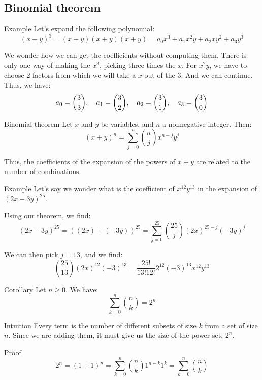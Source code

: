 \documentclass[a4paper]{article}
\begin{document}
\subsection{Binomial theorem}
\begin{parag}{Example}
    Let's expand the following polynomial: 
    \[\left(x + y\right)^3 = \left(x + y\right)\left(x + y\right)\left(x + y\right) = a_0 x^3 + a_1 x^2 y + a_2 xy^2 + a_3 y^3\]
    
    We wonder how we can get the coefficients without computing them. There is only one way of making the $x^3$, picking three times the $x$. For $x^2 y$, we have to choose 2 factors from which we will take a $x$ out of the 3. And we can continue. Thus, we have: 
    \[a_0 = \binom{3}{3}, \quad a_1 = \binom{3}{2}, \quad a_2 = \binom{3}{1}, \quad a_3 = \binom{3}{0}\]
\end{parag}

\begin{parag}{Binomial theorem}
    Let $x$ and $y$ be variables, and $n$ a nonnegative integer. Then: 
    \[\left(x + y\right)^n = \sum_{j=0}^{n} \binom{n}{j} x^{n - j} y^{j}\]
    
    Thus, the coefficients of the expansion of the powers of $x + y$ are related to the number of combinations.
\end{parag}


\begin{parag}{Example}
    Let's say we wonder what is the coefficient of $x^{12} y^{13}$ in the expansion of $\left(2x - 3y\right)^{25}$. 

    Using our theorem, we find: 
    \[\left(2x - 3y\right)^{25} = \left(\left(2x\right) + \left(-3y\right)\right)^{25} = \sum_{j=0}^{25} \binom{25}{j} \left(2x\right)^{25 - j} \left(-3y\right)^j\]
    
    We can then pick $j = 13$, and we find: 
    \[\binom{25}{13} \left(2x\right)^{12} \left(-3\right)^{13} = \frac{25!}{13!12!} 2^{12} \left(-3\right)^{13} x^{12} y^{13}\]
\end{parag}

\begin{parag}{Corollary}
    Let $n \geq 0$. We have: 
    \[\sum_{k = 0}^{n} \binom{n}{k} = 2^{n}\]
    
    \begin{subparag}{Intuition}
        Every term is the number of different subsets of size $k$ from a set of size $n$. Since we are adding them, it must give us the size of the power set, $2^n$.
    \end{subparag}

    \begin{subparag}{Proof}
        \[2^n = \left(1 + 1\right)^n = \sum_{k=0}^{n} \binom{n}{k} 1^{n-k} 1^{k} = \sum_{k=0}^{n} \binom{n}{k}\]
    \end{subparag}
\end{parag}
\end{document}
